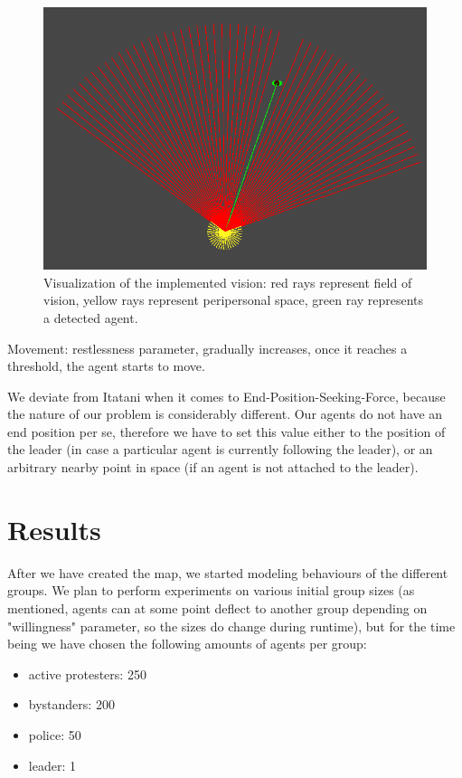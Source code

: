 \documentclass[9pt]{pnas-new}
\begin{document}
\begin{figure}[H]
\centering
\includegraphics[width=0.95\columnwidth]{vision.png}
\caption{Visualization of the implemented vision: red rays represent field of vision, yellow rays represent peripersonal space, green ray represents a detected agent.}
\label{vision}
\end{figure}


Movement: restlessness parameter, gradually increases, once it reaches a threshold, the agent starts to move. 

We deviate from Itatani \cite{socialcrowdsimulation} when it comes to End-Position-Seeking-Force, because the nature of our problem is considerably different. Our agents do not have an end position per se, therefore we have to set this value either to the position of the leader (in case a particular agent is currently following the leader), or an arbitrary nearby point in space (if an agent is not attached to the leader). 


\section*{Results}

\bigskip
After we have created the map, we started modeling behaviours of the different groups. We plan to perform experiments on various initial group sizes (as mentioned, agents can at some point deflect to another group depending on "willingness" parameter, so the sizes do change during runtime), but for the time being we have chosen the following amounts of agents per group:
\begin{itemize}
    \item active protesters: 250
    \item bystanders: 200
    \item police: 50
    \item leader: 1
\end{itemize}
\end{document}
